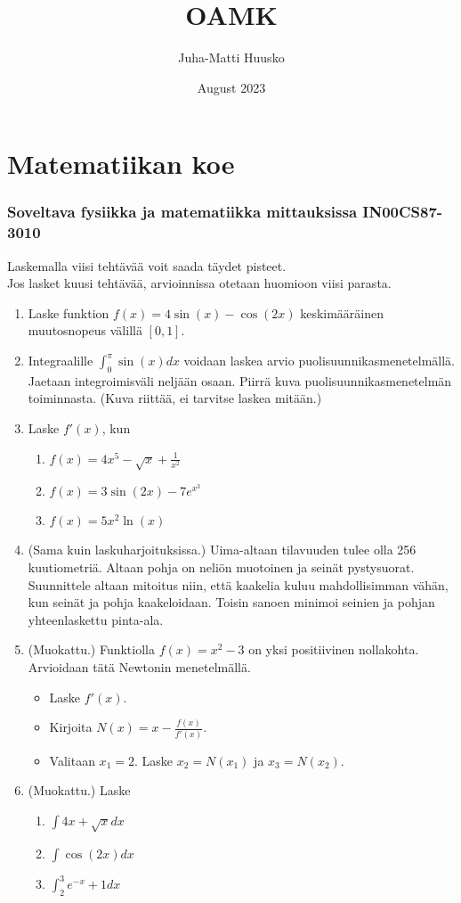\documentclass[12pt]{article}
\title{OAMK}
\author{Juha-Matti Huusko}
\date{August 2023}
\begin{document}
\thispagestyle{empty}

\section*{Matematiikan koe}
\subsubsection*{Soveltava fysiikka ja matematiikka mittauksissa IN00CS87-3010}

Laskemalla viisi tehtävää voit saada täydet pisteet.\\ Jos lasket kuusi tehtävää, arvioinnissa otetaan huomioon viisi parasta.

\begin{enumerate}
\item Laske funktion $f(x)=4\sin(x)-\cos(2x)$ keskimääräinen muutosnopeus välillä $[0,1]$.
\item Integraalille $\int_0^\pi \sin(x)dx$ voidaan laskea arvio puolisuunnikasmenetelmällä. Jaetaan integroimisväli neljään osaan. Piirrä kuva puolisuunnikasmenetelmän toiminnasta. (Kuva riittää, ei tarvitse laskea mitään.)
\item Laske $f'(x)$, kun
\begin{enumerate}
\item $f(x)=4x^5-\sqrt{x}+\frac{1}{x^2}$
\item $f(x)=3\sin(2x)-7e^{x^3}$
\item $f(x)=5x^2\ln(x)$
\end{enumerate}
\item (Sama kuin laskuharjoituksissa.) Uima-altaan tilavuuden tulee olla 256 kuutiometriä. Altaan pohja on neliön muotoinen ja seinät pystysuorat. Suunnittele altaan mitoitus niin, että kaakelia kuluu mahdollisimman vähän, kun seinät ja pohja kaakeloidaan. Toisin sanoen minimoi seinien ja pohjan yhteenlaskettu pinta-ala.
 \item (Muokattu.) Funktiolla $f(x)=x^2-3$ on yksi positiivinen nollakohta. Arvioidaan tätä Newtonin menetelmällä.
\begin{itemize}
\item Laske $f'(x)$.
\item Kirjoita $N(x)=x-\frac{f(x)}{f'(x)}$.
\item Valitaan $x_1=2$. Laske $x_2=N(x_1)$ ja $x_3=N(x_2)$.
\end{itemize}
\item (Muokattu.) Laske
\begin{enumerate}
\item $\int 4x+\sqrt{x}dx$
\item $\int \cos(2x)dx$
\item $\int_2^3 e^{-x}+1dx$
\end{enumerate}
\end{enumerate}
\end{document}
